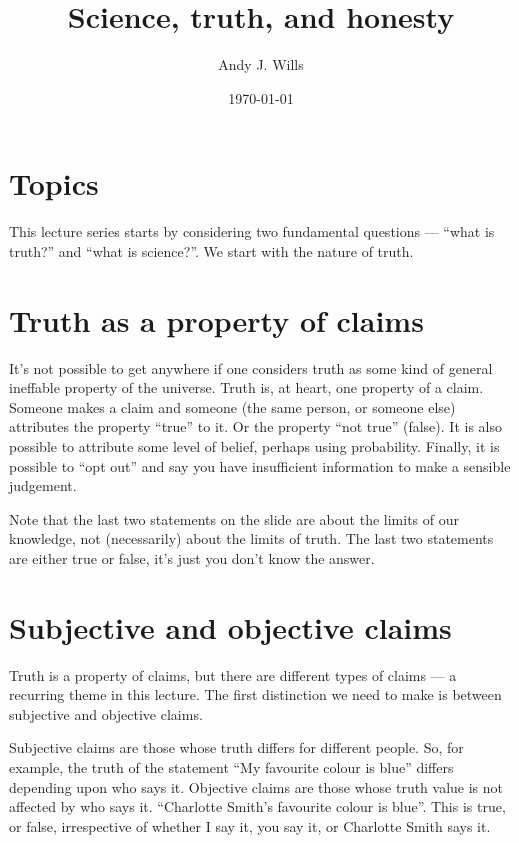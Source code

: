 \documentclass[12pt]{article}
\begin{document}
	\title{Science, truth, and honesty}
	\date{\today}
	\author{Andy J. Wills}
	\maketitle

\section{Topics}

This lecture series starts by considering two fundamental questions
--- ``what is truth?'' and ``what is science?''. We start with the
nature of truth.

\section{Truth as a property of claims}

It's not possible to get anywhere if one considers truth as some kind
of general ineffable property of the universe. Truth is, at heart, one
property of a claim. Someone makes a claim and someone (the same
person, or someone else) attributes the property ``true'' to it. Or
the property ``not true'' (false). It is also possible to attribute
some level of belief, perhaps using probability. Finally, it is
possible to ``opt out'' and say you have insufficient information to
make a sensible judgement.

Note that the last two statements on the slide are about the limits of
our knowledge, not (necessarily) about the limits of truth. The last
two statements are either true or false, it's just you don't know the
answer.

\section{Subjective and objective claims}

Truth is a property of claims, but there are different types of claims
--- a recurring theme in this lecture. The first distinction we need
to make is between subjective and objective claims.

Subjective claims are those whose truth differs for different
people. So, for example, the truth of the statement ``My favourite
colour is blue'' differs depending upon who says it. Objective claims
are those whose truth value is not affected by who says
it. ``Charlotte Smith's favourite colour is blue''. This is true, or
false, irrespective of whether I say it, you say it, or Charlotte
Smith says it.
\end{document}
